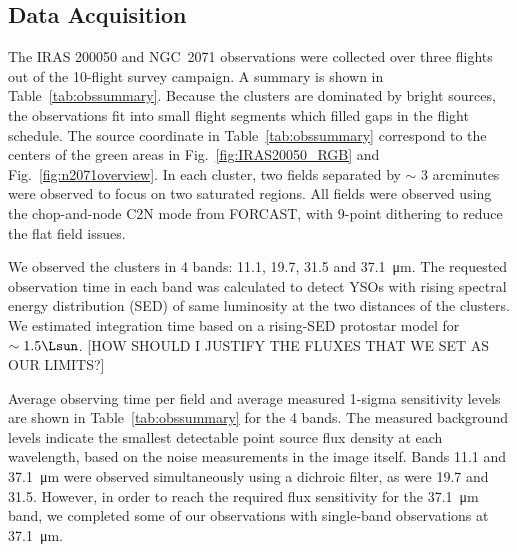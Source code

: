 \subsection{Data Acquisition}
The IRAS 200050 and NGC~2071 observations were collected over three flights out of the 10-flight survey campaign. A summary is shown in Table~\ref{tab:obssummary}. Because the clusters are dominated by bright sources, the observations fit into small flight segments which filled gaps in the flight schedule. The source coordinate in Table~\ref{tab:obssummary} correspond to the centers of the green areas in Fig.~\ref{fig:IRAS20050_RGB} and Fig.~\ref{fig:n2071overview}. In each cluster, two fields separated by $\sim$ 3 arcminutes were observed to focus on two saturated regions. All fields were observed using the chop-and-node C2N mode from FORCAST, with 9-point dithering to reduce the flat field issues.



We observed the clusters in 4 bands: 11.1, 19.7, 31.5 and \SI{37.1}{\micro\meter}. The requested observation time in each band was calculated to detect YSOs with rising spectral energy distribution (SED) of same luminosity at the two distances of the clusters. We estimated integration time based on a rising-SED protostar model for $\sim 1.5\Lsun$. [HOW SHOULD I JUSTIFY THE FLUXES THAT WE SET AS OUR LIMITS?]

Average observing time per field and average measured 1-sigma sensitivity levels are shown in Table~\ref{tab:obssummary} for the 4 bands. The measured background levels indicate the smallest detectable point source flux density at each wavelength, based on the noise measurements in the image itself. Bands 11.1 and \SI{37.1}{\micro\meter} were observed simultaneously using a dichroic filter, as were 19.7 and 31.5. However, in order to reach the required flux sensitivity for the \SI{37.1}{\micro\meter} band, we completed some of our observations with single-band observations at \SI{37.1}{\micro\meter}. 

